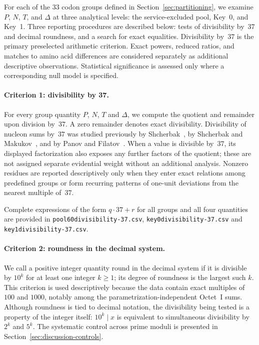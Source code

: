 \documentclass[11pt,a4paper]{article}
\renewcommand{\_}{\origunderscore\allowbreak}
\begin{document}
For each of the $33$ codon groups defined in
Section~\ref{sec:partitioning}, we examine $P$, $N$, $T$, and
$\Delta$ at three analytical levels: the service-excluded pool,
Key~0, and Key~1. Three reporting procedures are described below:
tests of divisibility by~$37$ and
decimal roundness, and a search for exact equalities. Divisibility
by~$37$ is the primary preselected arithmetic criterion. Exact powers,
reduced ratios, and matches to amino acid differences are considered
separately as additional descriptive observations. Statistical
significance is assessed only where a corresponding null model is
specified.

\paragraph{Criterion 1: divisibility by 37.}
For every group quantity $P$, $N$, $T$ and $\Delta$, we compute the
quotient and remainder upon division by~$37$. A zero remainder denotes
exact divisibility. Divisibility of nucleon sums by~$37$ was studied previously by
Shcherbak~\cite{shcherbak1993,shcherbak2003}, by Shcherbak and Makukov~\cite{makukov2013}, and by
Panov and Filatov~\cite{panov2024}. When a value is divisible by~$37$, its displayed
factorization also exposes any further factors of the quotient; these
are not assigned separate evidential weight without an additional
analysis. Nonzero residues are reported descriptively only when they enter
exact relations among predefined groups or form recurring patterns of
one-unit deviations from the nearest multiple of~$37$.

Complete expressions of the form $q\cdot37+r$ for all groups and all
four quantities are provided in
\texttt{pool60\_divisibility-37.csv},
\texttt{key0\_divisibility-37.csv} and
\texttt{key1\_divisibility-37.csv}.

\paragraph{Criterion 2: roundness in the decimal system.}
We call a positive integer quantity round in the decimal system if it
is divisible by $10^k$ for at least one integer $k\geq1$; its degree
of roundness is the largest such $k$. This criterion is used
descriptively because the data contain exact multiples of $100$ and
$1000$, notably among the parametrization-independent Octet~I sums.
Although roundness is tied to decimal notation, the divisibility being
tested is a property of the integer itself: $10^k\mid x$ is equivalent
to simultaneous divisibility by $2^k$ and $5^k$. The systematic
control across prime moduli is presented in
Section~\ref{sec:discussion-controls}.
\end{document}
